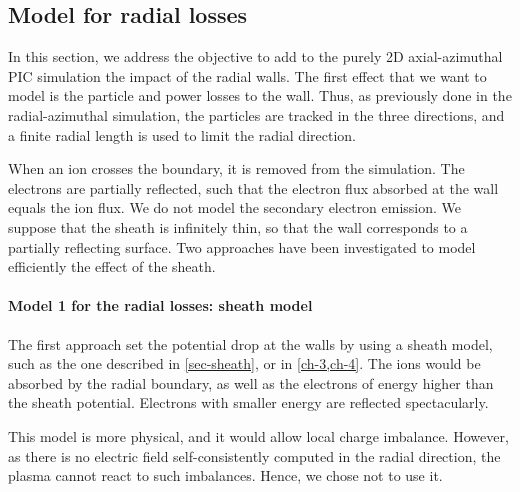 \subsection{Model for radial losses} \label{subsec-fakeR}

In this section, we address the objective to add to the purely \ac{2D} axial-azimuthal \ac{PIC} simulation the impact of the radial walls.
The first effect that we want to model is the particle and power losses to the wall.
Thus, as previously done in the radial-azimuthal simulation, the particles are tracked in the three directions, and a finite radial length is used to limit the radial direction.

When an ion crosses the boundary, it is removed from the simulation.
The electrons are partially reflected, such that the electron flux absorbed at the wall equals the ion flux.
We do not model the secondary electron emission.
We suppose that the sheath is infinitely thin, so that the wall corresponds to a partially reflecting surface.
Two approaches have been investigated to model efficiently the effect of the sheath.


\paragraph{ Model 1 for the radial losses\string: sheath model\\}
The first approach set the potential drop at the walls by using  a sheath model, such as the one described in \cref{sec-sheath}, or in \cref{ch-3,ch-4}.
The ions would be absorbed by the radial boundary, as well as the electrons of energy higher than the sheath potential.
Electrons with smaller energy are reflected spectacularly.

This model is more physical, and it would allow local charge imbalance.
However, as there is no electric field self-consistently computed in the radial direction, the plasma cannot react to such imbalances.
Hence, we chose not to use it.


